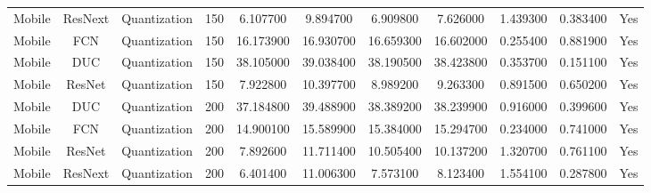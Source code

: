 \begin{tabular}{|c||c||c||c||c||c||c||c||c||c||c|}
Mobile & ResNext & Quantization & 150 & 6.107700 & 9.894700 & 6.909800 & 7.626000 & 1.439300 & 0.383400 & Yes \\
Mobile & FCN & Quantization & 150 & 16.173900 & 16.930700 & 16.659300 & 16.602000 & 0.255400 & 0.881900 & Yes \\
Mobile & DUC & Quantization & 150 & 38.105000 & 39.038400 & 38.190500 & 38.423800 & 0.353700 & 0.151100 & Yes \\
Mobile & ResNet & Quantization & 150 & 7.922800 & 10.397700 & 8.989200 & 9.263300 & 0.891500 & 0.650200 & Yes \\
Mobile & DUC & Quantization & 200 & 37.184800 & 39.488900 & 38.389200 & 38.239900 & 0.916000 & 0.399600 & Yes \\
Mobile & FCN & Quantization & 200 & 14.900100 & 15.589900 & 15.384000 & 15.294700 & 0.234000 & 0.741000 & Yes \\
Mobile & ResNet & Quantization & 200 & 7.892600 & 11.711400 & 10.505400 & 10.137200 & 1.320700 & 0.761100 & Yes \\
Mobile & ResNext & Quantization & 200 & 6.401400 & 11.006300 & 7.573100 & 8.123400 & 1.554100 & 0.287800 & Yes \\
\bottomrule
\end{tabular}
